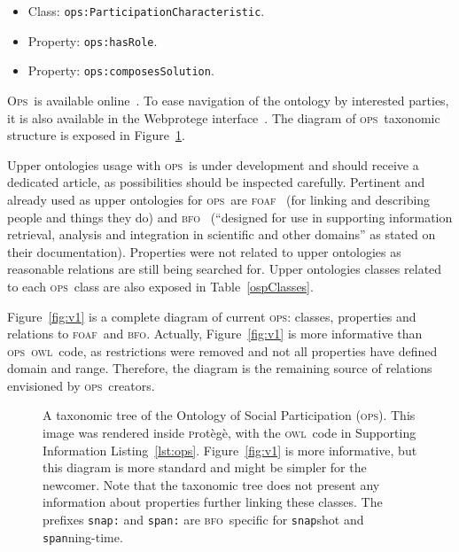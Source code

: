 \documentclass[10pt,letterpaper]{article}
\newcommand{\ops}{\textsc{ops}}
\newcommand{\opsi}{O\textsc{ps}}
\newcommand{\owl}{\textsc{owl}}
\newcommand{\bfo}{\textsc{bfo}}
\newcommand{\foaf}{\textsc{foaf}}
\newcommand{\protege}{\textsc{p}rot\`eg\`e}
\begin{document}
\begin{itemize}
    \item Class: {\tt    ops:ParticipationCharacteristic}.
    \item Property: {\tt ops:hasRole}.
    \item Property: {\tt ops:composesSolution}.
\end{itemize}

\opsi\ is available online~\cite{owlOSP}. To ease navigation of the ontology by interested parties, it is also available in the Webprotege interface~\cite{owlOSPwp}. The diagram of \ops\ taxonomic structure is exposed in Figure~\ref{fig:owlCC}.

Upper ontologies usage with \ops\ is under development and should receive a dedicated article, as possibilities should be inspected carefully. Pertinent and already used as upper ontologies for \ops\ are \foaf~\cite{foaf} (for linking and describing people and things they do) and \bfo~\cite{bfo} (``designed for use in supporting information retrieval, analysis and integration in scientific and other domains'' as stated on their documentation). Properties were not related to upper ontologies as reasonable relations are still being searched for. Upper ontologies classes related to each \ops\ class are also exposed in Table~\ref{ospClasses}.

Figure~\ref{fig:v1} is a complete diagram of current \ops: classes, properties and relations to \foaf\ and \bfo. Actually, Figure~\ref{fig:v1} is more informative than \ops\ \owl\ code, as restrictions were removed and not all properties have defined domain and range. Therefore, the diagram is the remaining source of relations envisioned by \ops\ creators.

\begin{figure}
    \centering
    \caption{A taxonomic tree of the Ontology of Social Participation (\ops). This image was rendered inside \protege, with the \owl\ code in Supporting Information Listing~\ref{lst:ops}. Figure~\ref{fig:v1} is more informative, but this diagram is more standard and might be simpler for the newcomer. Note that the taxonomic tree does not present any information about properties further linking these classes. The prefixes {\tt snap:} and {\tt span:} are \bfo\ specific for {\tt snap}shot and {\tt span}ning-time.}
    \label{fig:owlCC}
\end{figure}

\end{document}
